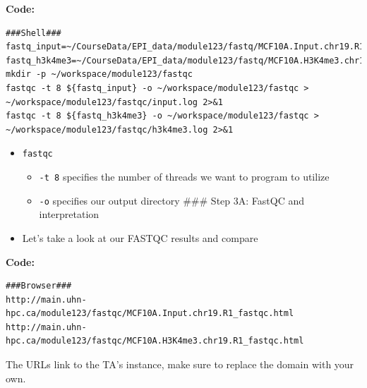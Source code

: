 \documentclass[
]{book}
\providecommand{\tightlist}{%
  \setlength{\itemsep}{0pt}\setlength{\parskip}{0pt}}
\begin{document}
\textbf{Code:}

\begin{verbatim}
###Shell###
fastq_input=~/CourseData/EPI_data/module123/fastq/MCF10A.Input.chr19.R1.fastq.gz
fastq_h3k4me3=~/CourseData/EPI_data/module123/fastq/MCF10A.H3K4me3.chr19.R1.fastq.gz
mkdir -p ~/workspace/module123/fastqc
fastqc -t 8 ${fastq_input} -o ~/workspace/module123/fastqc > ~/workspace/module123/fastqc/input.log 2>&1
fastqc -t 8 ${fastq_h3k4me3} -o ~/workspace/module123/fastqc > ~/workspace/module123/fastqc/h3k4me3.log 2>&1
\end{verbatim}

\begin{itemize}
\tightlist
\item
  \texttt{fastqc}

  \begin{itemize}
  \tightlist
  \item
    \texttt{-t\ 8} specifies the number of threads we want to program to utilize
  \item
    \texttt{-o} specifies our output directory
    \#\#\# Step 3A: FastQC and interpretation
  \end{itemize}
\item
  Let's take a look at our FASTQC results and compare
\end{itemize}

\textbf{Code:}

\begin{verbatim}
###Browser###
http://main.uhn-hpc.ca/module123/fastqc/MCF10A.Input.chr19.R1_fastqc.html
http://main.uhn-hpc.ca/module123/fastqc/MCF10A.H3K4me3.chr19.R1_fastqc.html
\end{verbatim}

The URLs link to the TA's instance, make sure to replace the domain with your own.
\end{document}
